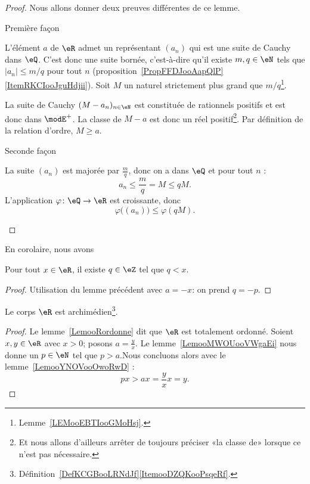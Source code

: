 \begin{proof}
    Nous allons donner deux preuves différentes de ce lemme.
    \begin{subproof}
    \item[Première façon]

        L'élément \( a\) de \( \eR\) admet un représentant \( (a_n)\) qui est une suite de Cauchy dans \( \eQ\). C'est donc une suite bornée, c'est-à-dire qu'il existe \( m,q\in \eN\) tels que \( | a_n |\leq m/q\) pour tout \( n\) (proposition~\ref{PropFFDJooAapQlP}\ref{ItemRKCIooJguHdjii}). Soit \( M\) un naturel strictement plus grand que \( m/q\)\footnote{Lemme~\ref{LEMooEBTIooGMoHsj}.}.

    La suite de Cauchy \( (M-a_n)_{n\in \eN}\) est constituée de rationnels positifs et est donc dans \( \modE^+\). La classe de \( M-a\) est donc un réel positif\footnote{Et nous allons d'ailleurs arrêter de toujours préciser «la classe de» lorsque ce n'est pas nécessaire.}. Par définition de la relation d'ordre, \( M\geq a\).
\item[Seconde façon]

    La suite \( (a_n)\) est majorée par \( \frac{ m }{ q }\), donc on a dans \( \eQ\) et pour tout \( n\) :
    \begin{equation}
        a_n\leq \frac{ m }{ q }=M\leq qM.
    \end{equation}
    L'application \( \varphi\colon \eQ\to \eR\) est croissante, donc
    \begin{equation}
        \varphi\big( (a_n) \big)\leq \varphi(qM).
    \end{equation}
    \end{subproof}
\end{proof}

En corolaire, nous avons
\begin{lemma}      \label{LEMooMWOUooVWgbFi}
    Pour tout \( x\in \eR\), il existe \( q\in \eZ\) tel que \( q < x\).
\end{lemma}
\begin{proof}
    Utilisation du lemme précédent avec \( a = -x \): on prend \( q = -p \).
\end{proof}

\begin{theorem}        \label{ThoooKJTTooCaxEny}
    Le corps \( \eR\) est archimédien\footnote{Définition~\ref{DefKCGBooLRNdJf}\ref{ItemooDZQKooPsqeRf}.}.
\end{theorem}

\begin{proof}
    Le lemme~\ref{LemooRordonne} dit que \( \eR\) est totalement ordonné. Soient \( x,y\in \eR\) avec \( x>0\); posons \( a=\frac{ y }{ x }\). Le lemme~\ref{LemooMWOUooVWgaEi} nous donne un \( p \in \eN\) tel que \(p > a\).Nous concluons alors avec le lemme~\ref{LemooYNOVooOwoRwD} :
    \begin{equation}
        px>ax=\frac{ y }{ x }x=y.
    \end{equation}
\end{proof}

